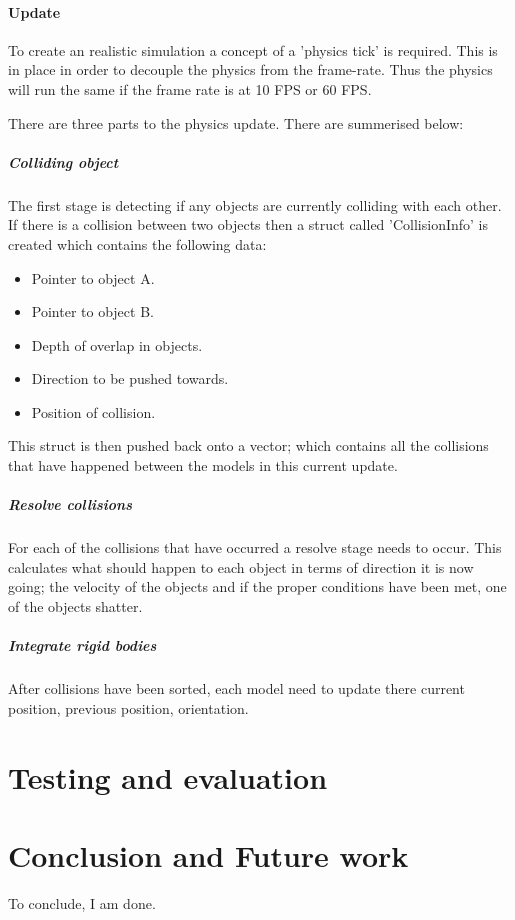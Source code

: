 \documentclass[conference,backref=page]{acmsiggraph}
\begin{document}
\paragraph{Update} \hfill

To create an realistic simulation a concept of a 'physics tick' is required. This is in place in order to decouple the physics from the frame-rate. Thus the physics will run the same if the frame rate is at 10 FPS or 60 FPS.  

There are three parts to the physics update. There are summerised below:

\subparagraph{Colliding object}
The first stage is detecting if any objects are currently colliding with each other.
If there is a collision between two objects then a struct called 'CollisionInfo' is created which contains the following data:

\begin{itemize}
\item{Pointer to object A.}
\item{Pointer to object B.}
\item{Depth of overlap in objects.}
\item{Direction to be pushed towards.}
\item{Position of collision.}
\end{itemize}

This struct is then pushed back onto a vector; which contains all the collisions that have happened between the models in this current update.
\subparagraph{Resolve collisions}\hfill

For each of the collisions that have occurred a resolve stage needs to occur. This calculates what should happen to each object in terms of direction it is now going; the velocity of the objects and if the proper conditions have been met, one of the objects shatter.
\subparagraph{Integrate rigid bodies}\hfill

After collisions have been sorted, each model need to update there current position, previous position, orientation.

\section{Testing and evaluation}


\section{Conclusion and Future work}
To conclude, I am done.




\end{document}
